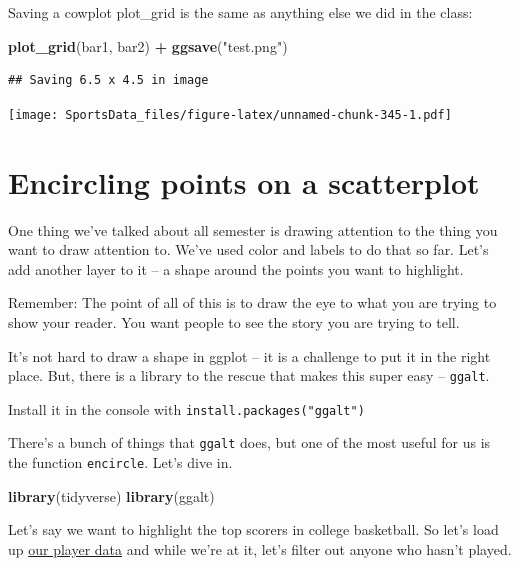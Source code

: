 \documentclass[
]{book}
\newenvironment{Shaded}{\begin{snugshade}}{\end{snugshade}}
\newcommand{\KeywordTok}[1]{\textcolor[rgb]{0.13,0.29,0.53}{\textbf{#1}}}
\newcommand{\NormalTok}[1]{#1}
\newcommand{\OperatorTok}[1]{\textcolor[rgb]{0.81,0.36,0.00}{\textbf{#1}}}
\newcommand{\StringTok}[1]{\textcolor[rgb]{0.31,0.60,0.02}{#1}}
\begin{document}
Saving a cowplot plot\_grid is the same as anything else we did in the class:

\begin{Shaded}
\begin{Highlighting}[]
\KeywordTok{plot_grid}\NormalTok{(bar1, bar2) }\OperatorTok{+}\StringTok{ }\KeywordTok{ggsave}\NormalTok{(}\StringTok{"test.png"}\NormalTok{)}
\end{Highlighting}
\end{Shaded}

\begin{verbatim}
## Saving 6.5 x 4.5 in image
\end{verbatim}

\texttt{[image: SportsData\_files/figure-latex/unnamed-chunk-345-1.pdf]}

\hypertarget{encircling-points-on-a-scatterplot}{%
\chapter{Encircling points on a scatterplot}\label{encircling-points-on-a-scatterplot}}

One thing we've talked about all semester is drawing attention to the thing you want to draw attention to. We've used color and labels to do that so far. Let's add another layer to it -- a shape around the points you want to highlight.

Remember: The point of all of this is to draw the eye to what you are trying to show your reader. You want people to see the story you are trying to tell.

It's not hard to draw a shape in ggplot -- it is a challenge to put it in the right place. But, there is a library to the rescue that makes this super easy -- \texttt{ggalt}.

Install it in the console with \texttt{install.packages("ggalt")}

There's a bunch of things that \texttt{ggalt} does, but one of the most useful for us is the function \texttt{encircle}. Let's dive in.

\begin{Shaded}
\begin{Highlighting}[]
\KeywordTok{library}\NormalTok{(tidyverse)}
\KeywordTok{library}\NormalTok{(ggalt)}
\end{Highlighting}
\end{Shaded}

Let's say we want to highlight the top scorers in college basketball. So let's load up \href{https://unl.box.com/s/0g56ve61y6hakyxzr1u4t534721bqvg8}{our player data} and while we're at it, let's filter out anyone who hasn't played.
\end{document}
